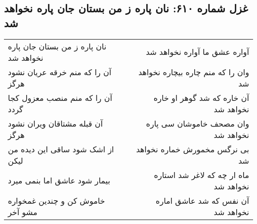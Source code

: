 \begin{center}
\section*{غزل شماره ۶۱۰: نان پاره ز من بستان جان پاره نخواهد شد}
\label{sec:0610}
\begin{longtable}{l p{0.5cm} r}
نان پاره ز من بستان جان پاره نخواهد شد
&&
آواره عشق ما آواره نخواهد شد
\\
آن را که منم خرقه عریان نشود هرگز
&&
وان را که منم چاره بیچاره نخواهد شد
\\
آن را که منم منصب معزول کجا گردد
&&
آن خاره که شد گوهر او خاره نخواهد شد
\\
آن قبله مشتاقان ویران نشود هرگز
&&
وان مصحف خاموشان سی پاره نخواهد شد
\\
از اشک شود ساقی این دیده من لیکن
&&
بی نرگس مخمورش خماره نخواهد شد
\\
بیمار شود عاشق اما بنمی میرد
&&
ماه ار چه که لاغر شد استاره نخواهد شد
\\
خاموش کن و چندین غمخواره مشو آخر
&&
آن نفس که شد عاشق اماره نخواهد شد
\\
\end{longtable}
\end{center}
